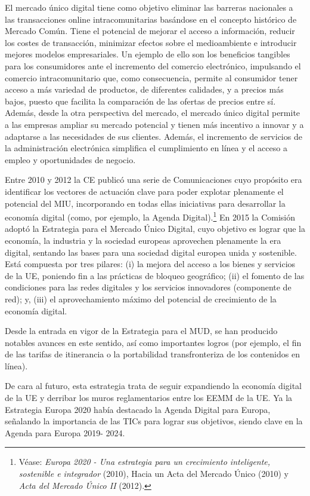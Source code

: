 \documentclass[10pt,a4paper]{article}
\begin{document}
El mercado único digital tiene como objetivo eliminar las barreras nacionales a las transacciones online intracomunitarias basándose en el concepto histórico de Mercado Común. Tiene el potencial de mejorar el acceso a información, reducir los costes de transacción, minimizar efectos sobre el medioambiente e introducir mejores modelos empresariales. Un ejemplo de ello son los beneficios tangibles para los consumidores ante el incremento del comercio electrónico, impulsando el comercio intracomunitario que, como consecuencia, permite al consumidor tener acceso a más variedad de productos, de diferentes calidades, y a precios más bajos, puesto que facilita la comparación de las ofertas de precios entre sí. Además, desde la otra perspectiva del mercado, el mercado único digital permite a las empresas ampliar su mercado potencial y tienen más incentivo a innovar y a adaptarse a las necesidades de sus clientes. Además, el incremento de servicios de la administración electrónica simplifica el cumplimiento en línea y el acceso a empleo y oportunidades de negocio.

Entre 2010 y 2012 la CE publicó una serie de Comunicaciones  cuyo propósito era identificar los vectores de actuación clave para poder explotar plenamente el potencial del MIU, incorporando en todas ellas iniciativas para desarrollar la economía digital (como, por ejemplo, la Agenda Digital).\footnote{%
    Véase: \textit{Europa 2020 - Una estrategia para un crecimiento inteligente, sostenible e integrador} (2010), Hacia un Acta del Mercado Único (2010) y \textit{Acta del Mercado Único II} (2012).
} En 2015 la Comisión adoptó la Estrategia para el Mercado Único Digital, cuyo objetivo es lograr que la economía, la industria y la sociedad europeas aprovechen plenamente la era digital, sentando las bases para una sociedad digital europea unida y sostenible. Está compuesta por tres pilares: (i) la mejora del acceso a los bienes y servicios de la UE, poniendo fin a las prácticas de bloqueo geográfico; (ii) el fomento de las condiciones para las redes digitales y los servicios innovadores (componente de red); y, (iii) el aprovechamiento máximo del potencial de crecimiento de la economía digital.

Desde la entrada en vigor de la Estrategia para el MUD, se han producido notables avances en este sentido, así como importantes logros (por ejemplo, el fin de las tarifas de itinerancia o la portabilidad transfronteriza de los contenidos en línea).

De cara al futuro, esta estrategia trata de seguir expandiendo la economía digital de la UE y derribar los muros reglamentarios entre los EEMM de la UE. Ya la Estrategia Europa 2020 había destacado la Agenda Digital para Europa, señalando la importancia de las TICs para lograr sus objetivos, siendo clave en la Agenda para Europa 2019- 2024.
\end{document}

